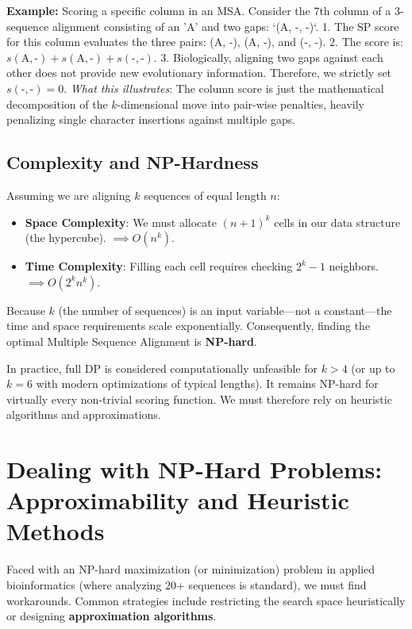 \textbf{Example:} Scoring a specific column in an MSA.
Consider the 7th column of a 3-sequence alignment consisting of an 'A' and two gaps: `(A, -, -)`.
1. The SP score for this column evaluates the three pairs: (A, -), (A, -), and (-, -).
2. The score is: $s(\text{A}, \text{-}) + s(\text{A}, \text{-}) + s(\text{-}, \text{-})$.
3. Biologically, aligning two gaps against each other does not provide new evolutionary information. Therefore, we strictly set $s(\text{-}, \text{-}) = 0$.
\textit{What this illustrates}: The column score is just the mathematical decomposition of the $k$-dimensional move into pair-wise penalties, heavily penalizing single character insertions against multiple gaps.

\subsection{Complexity and NP-Hardness}

Assuming we are aligning $k$ sequences of equal length $n$:
\begin{itemize}
    \item \textbf{Space Complexity}: We must allocate $(n+1)^k$ cells in our data structure (the hypercube). $\implies O(n^k)$.
    \item \textbf{Time Complexity}: Filling each cell requires checking $2^k - 1$ neighbors. $\implies O(2^k n^k)$.
\end{itemize}

\sta Because $k$ (the number of sequences) is an input variable—not a constant—the time and space requirements scale exponentially. Consequently, finding the optimal Multiple Sequence Alignment is \textbf{NP-hard}.

In practice, full DP is considered computationally unfeasible for $k > 4$ (or up to $k=6$ with modern optimizations of typical lengths). It remains NP-hard for virtually every non-trivial scoring function. We must therefore rely on heuristic algorithms and approximations.

\section{Dealing with NP-Hard Problems: Approximability and Heuristic Methods}

Faced with an NP-hard maximization (or minimization) problem in applied bioinformatics (where analyzing 20+ sequences is standard), we must find workarounds. Common strategies include restricting the search space heuristically or designing \textbf{approximation algorithms}.

